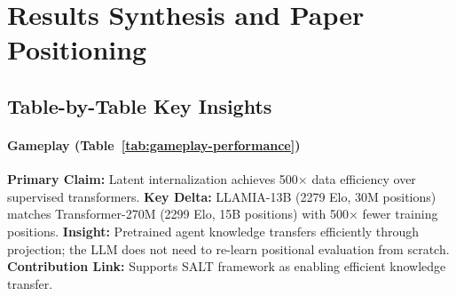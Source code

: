     
    




\section{Results Synthesis and Paper Positioning}
\label{sec:results_synthesis}


\subsection{Table-by-Table Key Insights}

\paragraph{Gameplay (Table~\ref{tab:gameplay-performance})}
\textbf{Primary Claim:} Latent internalization achieves 500$\times$ data efficiency over supervised transformers.
\textbf{Key Delta:} LLAMIA-13B (2279 Elo, 30M positions) matches Transformer-270M (2299 Elo, 15B positions) with 500$\times$ fewer training positions.
\textbf{Insight:} Pretrained agent knowledge transfers efficiently through projection; the LLM does not need to re-learn positional evaluation from scratch.
\textbf{Contribution Link:} Supports SALT framework as enabling efficient knowledge transfer.

